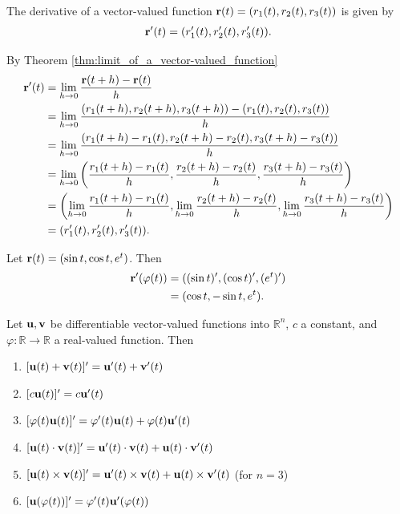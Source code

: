 \documentclass[12pt,letterpaper,reqno]{article}
\numberwithin{equation}{section}
\newcommand{\R}{\ensuremath{\mathbb R}}
\newcommand{\bu}{{\bf u}}
\newcommand{\bv}{{\bf v}}
\newcommand{\bbr}{{\bf r}}
\begin{document}
{\begin{thm}\label{thm:derivative_of_a_vector-valued_function}
	The derivative of a vector-valued function $\bbr(t)=(r_1(t),r_2(t),r_3(t))$ is given by 
	\begin{align*}
		\bbr'(t)=(r_1'(t),r_2'(t),r_3'(t)).
	\end{align*}
\end{thm}

\begin{pf}
By Theorem \ref{thm:limit_of_a_vector-valued_function}
\begin{align*}
	\bbr'(t)&=\lim_{h \to 0}\frac{\bbr(t+h)-\bbr(t)}{h} \\
	&=\lim_{h \to 0}\frac{(r_1(t+h),r_2(t+h),r_3(t+h))-(r_1(t),r_2(t),r_3(t))}{h} \\
	&=\lim_{h \to 0}\frac{(r_1(t+h)-r_1(t),r_2(t+h)-r_2(t),r_3(t+h)-r_3(t))}{h} \\
	&=\lim_{h \to 0}\left(\frac{r_1(t+h)-r_1(t)}{h},\frac{r_2(t+h)-r_2(t)}{h},\frac{r_3(t+h)-r_3(t)}{h}\right) \\
	&=\left(\lim_{h \to 0}\frac{r_1(t+h)-r_1(t)}{h},\lim_{h \to 0}\frac{r_2(t+h)-r_2(t)}{h},\lim_{h \to 0}\frac{r_3(t+h)-r_3(t)}{h}\right) \\
	&=(r_1'(t),r_2'(t),r_3'(t)).
\end{align*}	
\end{pf}

\begin{example}
Let $\bbr(t)=(\sin t,\cos t,e^t)$. Then
\begin{align*}
	\bbr'(\varphi(t))&=((\sin t)',(\cos t)',(e^t)') \\
	&=(\cos t, - \sin t, e^t).
\end{align*}	
\end{example}

\begin{thm}
	Let $\bu,\bv$ be differentiable vector-valued functions into $\R^n$, $c$ a constant, and $\varphi:\mathbb{R} \to \mathbb{R}$ a real-valued function. Then
\begin{enumerate}[(1)]
		\item $[\bu(t)+\bv(t)]'=\bu'(t)+\bv'(t)$
		\item $[c\bu(t)]'=c\bu'(t)$
		\item $[\varphi(t)\bu(t)]'=\varphi'(t)\bu(t)+\varphi(t)\bu'(t)$
		\item $[\bu(t)\cdot \bv(t)]'=\bu'(t)\cdot \bv(t)+\bu(t) \cdot \bv'(t)$
		\item $[\bu(t)\times \bv(t)]'=\bu'(t)\times \bv(t)+\bu(t) \times \bv'(t)$ (for $n=3$)
		\item $[\bu(\varphi(t))]'=\varphi'(t)\bu'(\varphi(t))$
	\end{enumerate}	
\end{thm}

}
\end{document}

